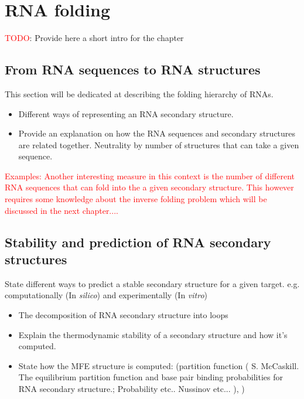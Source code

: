 \chapter{RNA folding}\label{ch:folding}

\textcolor{red}{TODO}: Provide here a short intro for the chapter 

\section{From RNA sequences to RNA structures}

This section will be dedicated at describing the folding hierarchy of RNAs. 

\begin{itemize}
	\item Different ways of representing an RNA secondary structure. 
	\item Provide an explanation on how the RNA sequences and secondary structures  are related together. Neutrality by number of structures that can take a given sequence.
\end{itemize}
\textcolor{red}{Examples: Another interesting measure in this context is the number of different RNA sequences that can fold into the a given secondary structure. This however requires some knowledge about the inverse folding problem which will be discussed in the next chapter....}


\section{Stability and prediction of RNA secondary structures}

State different ways to predict a stable secondary structure for a given target. e.g. computationally (In \textit{silico}) and experimentally (In \textit{vitro})

\begin{itemize}
	\item The decomposition of RNA secondary structure into loops
	\item Explain the thermodynamic stability of a secondary structure and how it's computed. 
	\item  State how the MFE structure is computed: (partition function ( S. McCaskill. The equilibrium partition function and base pair binding probabilities for RNA secondary structure.; Probability etc..  Nussinov etc... ), )
\end{itemize}


